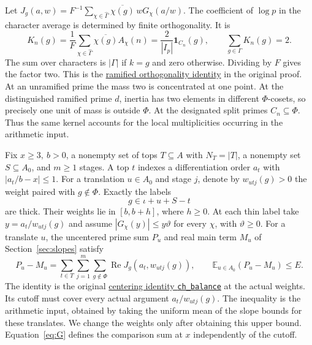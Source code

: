 \documentclass[11pt,letterpaper]{article}
\newcommand{\E}{\mathbb E}
\newcommand{\ind}{\mathbf 1}
\newcommand{\Rea}{\operatorname{Re}}
\newcommand{\src}[2]{\href{https://github.com/leanprover-community/riemann-hypothesis/blob/main/src/#1.lean}{#2}}
\numberwithin{equation}{section}
\begin{document}
Let \(J_g(a,w)=F^{-1}\sum_{\chi\in\widehat\Gamma}\overline{\chi(g)}\,wG_\chi(a/w)\).
The coefficient of \(\log p\) in the character average is determined by finite orthogonality. It is
\begin{equation}\label{eq:kernel}
 K_n(g)=\frac1F\sum_{\chi\in\widehat\Gamma}\overline{\chi(g)} A_\chi(n)
       =\frac{2}{|I_p|}\ind_{C_n}(g),\qquad
       \sum_{g\in\Gamma}K_n(g)=2 .
\end{equation}
The sum over characters is \(|\Gamma|\) if \(k=g\) and zero otherwise. Dividing by \(F\) gives the factor two. This is the
\src{Formalism/SizeWindowBrackets/ChainSlopeWindows/StronglyIrreducible}{ramified orthogonality identity}
in the original proof. At an unramified prime the mass two is concentrated at one point. At the distinguished ramified prime \(d\), inertia has two elements in different \(\Phi\)-cosets, so precisely one unit of mass is outside \(\Phi\). At the designated split primes \(C_n\subseteq\Phi\). Thus the same kernel accounts for the local multiplicities occurring in the arithmetic input.

Fix \(x\ge3,\ b>0\), a nonempty set of tops \(T\subseteq A\) with \(N_T=|T|\), a nonempty set \(S\subseteq A_0\), and \(m\ge1\) stages. A top \(t\) indexes a differentiation order \(a_t\) with \(|a_t/b-x|\le1\). For a translation \(u\in A_0\) and stage \(j\), denote by \(w_{utj}(g)>0\) the weight paired with \(g\notin\Phi\). Exactly the labels
\[
                 g\in\iota+u+S-t
\]
are thick. Their weights lie in \([b,b+h]\), where \(h\ge0\). At each thin label take \(y=a_t/w_{utj}(g)\) and assume \(|G_\chi(y)|\le y\vartheta\) for every \(\chi\), with \(\vartheta\ge0\).
For a translate \(u\), the uncentered prime sum \(P_u\) and real main term \(M_u\) of Section~\ref{sec:slopes} satisfy
\begin{equation}\label{eq:input}
 P_u-M_u=\sum_{t\in T}\sum_{j=1}^{m}\sum_{g\notin\Phi}
             \Rea J_g(a_t,w_{utj}(g)),\qquad
 \E_{u\in A_0}(P_u-M_u)\le E .
\end{equation}
The identity is the original
\src{Development/AutomorphicArithmetic/DedekindLFunctions/LandauTheorems/ChBalance}{centering identity \texttt{ch\_balance}}
at the actual weights. Its cutoff must cover every actual argument \(a_t/w_{utj}(g)\). The inequality is the arithmetic input, obtained by taking the uniform mean of the slope bounds for these translates. We change the weights only after obtaining this upper bound. Equation~\eqref{eq:G} defines the comparison sum at \(x\) independently of the cutoff.
\end{document}
